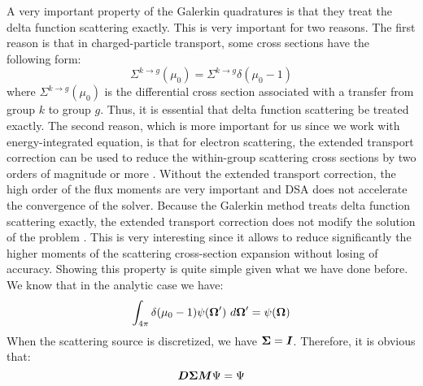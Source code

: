 A very important property of the Galerkin quadratures is that they treat the
delta function scattering exactly. This is very important for two reasons. 
The first reason is that in charged-particle transport, some cross sections 
have the following form:
\begin{equation}
\Sigma^{k\rightarrow g}(\mu_0) = \Sigma^{k\rightarrow g} \delta(\mu_0-1)
\end{equation}
where $\Sigma^{k\rightarrow g}(\mu_0)$ is the differential cross section
associated with a transfer from group $k$ to group $g$. Thus, it is essential
that delta function scattering be treated exactly. The second reason, which is
more important for us since we work with energy-integrated equation, is that for 
electron scattering, the extended transport correction \cite{lathrop} can be 
used to reduce the within-group scattering cross sections by two orders of 
magnitude or more \cite{morel_79}. Without the extended transport correction, 
the high order of the flux moments are very important and DSA does not 
accelerate the convergence of the solver. Because the Galerkin method treats 
delta function  scattering exactly, the extended transport correction does not
modify the solution of the problem \cite{morel_79}. This is very interesting 
since it allows to reduce significantly the higher moments of the scattering
cross-section expansion without losing of accuracy. Showing this property is
quite simple given what we have done before. We know that in the analytic case
we have:
\begin{equation}
\int_{4\pi} \delta(\mu_0-1) \psi(\boldsymbol{\Omega}')\ d\boldsymbol{\Omega}' = \psi(\boldsymbol{\Omega})
\end{equation}
When the scattering source is discretized, we have $\boldsymbol{\Sigma}=\boldsymbol{I}$.
Therefore, it is obvious that:
\begin{equation}
  \boldsymbol{D\Sigma M}\Psi = \Psi
\end{equation}


